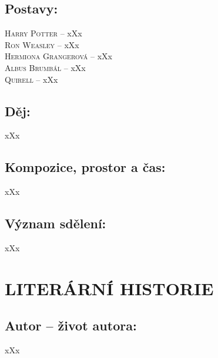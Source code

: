 \documentclass{extarticle} %
\begin{document}
\subsection*{Postavy:}
\noindent 
\textsc{Harry Potter --} xXx \\
\textsc{Ron Weasley --} xXx \\
\textsc{Hermiona Grangerová --} xXx \\
\textsc{Albus Brumbál --} xXx \\
\textsc{Quirell --} xXx \\

\subsection*{Děj:}
\noindent 
xXx

\subsection*{Kompozice, prostor a čas:}
\noindent 
xXx

\subsection*{Význam sdělení:}
\noindent 
xXx

\section*{LITERÁRNÍ HISTORIE}





\subsection*{Autor {\ssmall -- život autora:}}
\noindent 
xXx
\end{document}
